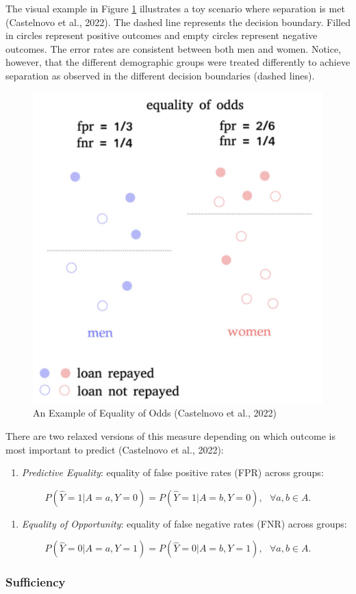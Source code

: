 \documentclass[12pt, twoside]{amherstthesis}
\providecommand{\tightlist}{%
  \setlength{\itemsep}{0pt}\setlength{\parskip}{0pt}}
\begin{document}
The visual example in Figure \ref{fig:eoo} illustrates a toy scenario where separation is met (Castelnovo et al., 2022). The dashed line represents the decision boundary. Filled in circles represent positive outcomes and empty circles represent negative outcomes. The error rates are consistent between both men and women. Notice, however, that the different demographic groups were treated differently to achieve separation as observed in the different decision boundaries (dashed lines).
\begin{figure}

{\centering \includegraphics[width=0.6\linewidth]{figures/eoo} 

}

\caption[An Example of Equality of Odds]{An Example of Equality of Odds (Castelnovo et al., 2022)}\label{fig:eoo}
\end{figure}
There are two relaxed versions of this measure depending on which outcome is most important to predict (Castelnovo et al., 2022):
\begin{enumerate}
\def\labelenumi{\roman{enumi})}
\tightlist
\item
  \emph{Predictive Equality}: equality of false positive rates (FPR) across groups:
\end{enumerate}
\begin{equation}
\label{ch1eq9}
P (\hat{Y} = 1 | A = a, Y = 0) = P (\hat{Y} = 1 | A = b, Y = 0), \text{ } \forall a,b \in A.
\end{equation}
\begin{enumerate}
\def\labelenumi{\roman{enumi})}
\setcounter{enumi}{1}
\tightlist
\item
  \emph{Equality of Opportunity}: equality of false negative rates (FNR) across groups:
\end{enumerate}
\begin{equation}
\label{ch1eq10}
P (\hat{Y} = 0 | A = a, Y = 1) = P (\hat{Y} = 0 | A = b, Y = 1), \text{ } \forall a,b \in A.
\end{equation}
\hypertarget{sufficiency}{%
\subsubsection{Sufficiency}\label{sufficiency}}
\end{document}
